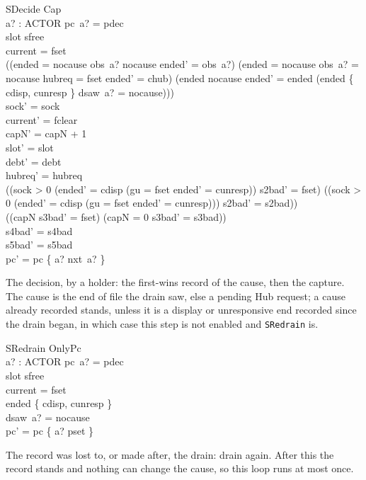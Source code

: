 \documentclass[a4paper,10pt,fleqn]{article}
\begin{document}
\begin{schema}{SDecide}
  Cap \\
  a? : ACTOR
\where
  pc~a? = pdec \\
  slot \neq sfree \\
  current = fset \\
  ((ended = nocause \land obs~a? \neq nocause \land ended' = obs~a?) \lor
    (ended = nocause \land obs~a? = nocause \land hubreq = fset \land ended' = chub) \lor
    (ended \neq nocause \land ended' = ended \land
      \lnot (ended \in \{ cdisp, cunresp \} \land dsaw~a? = nocause))) \\
  sock' = sock \\
  current' = fclear \\
  capN' = capN + 1 \\
  slot' = slot \\
  debt' = debt \\
  hubreq' = hubreq \\
  ((sock > 0 \land (ended' = cdisp \lor (gu = fset \land ended' = cunresp)) \land
      s2bad' = fset) \lor
    (\lnot (sock > 0 \land (ended' = cdisp \lor (gu = fset \land ended' = cunresp))) \land
      s2bad' = s2bad)) \\
  ((capN  \land s3bad' = fset) \lor (capN = 0 \land s3bad' = s3bad)) \\
  s4bad' = s4bad \\
  s5bad' = s5bad \\
  pc' = pc \oplus \{ a? \mapsto nxt~a? \}
\end{schema}

The decision, by a holder: the first-wins record of the cause, then the
capture.  The cause is the end of file the drain saw, else a pending Hub
request; a cause already recorded stands, unless it is a display or
unresponsive end recorded since the drain began, in which case this step is not
enabled and \texttt{SRedrain} is.

\begin{schema}{SRedrain}
  OnlyPc \\
  a? : ACTOR
\where
  pc~a? = pdec \\
  slot \neq sfree \\
  current = fset \\
  ended \in \{ cdisp, cunresp \} \\
  dsaw~a? = nocause \\
  pc' = pc \oplus \{ a? \mapsto pset \}
\end{schema}

The record was lost to, or made after, the drain: drain again.  After this the
record stands and nothing can change the cause, so this loop runs at most once.
\end{document}
